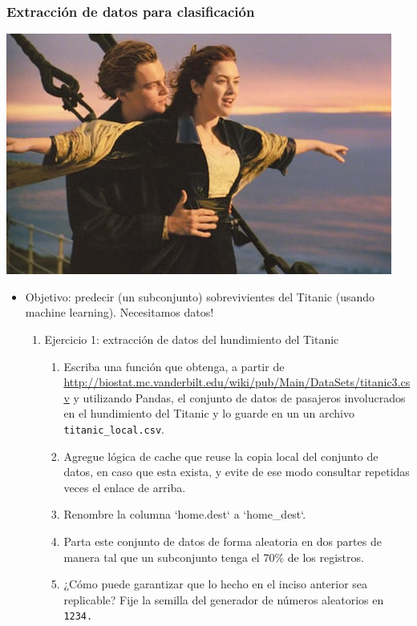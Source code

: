 \documentclass[leqno, 10pt, envcountsect]{beamer}
\numberwithin{equation}{section}
\theoremstyle{definition}
\theoremstyle{example}
\numberwithin{figure}{section}
\numberwithin{table}{section}
\let\olditem\item
\renewcommand{\item}{%
\olditem\vspace{1pt}}
\begin{document}
\begin{frame}
  \frametitle{Extracción de datos para clasificación}
  \begin{center}
    \includegraphics[scale=0.33]{titanic.jpg}
  \end{center}
  \begin{itemize}
    \item Objetivo: predecir (un subconjunto) sobrevivientes del Titanic (usando machine
      learning). Necesitamos datos!
      \begin{enumerate}
            \item Ejercicio 1: extracción de datos del hundimiento del Titanic
              \begin{enumerate}
                \item Escriba una función que obtenga, a partir de
                  \href{http://biostat.mc.vanderbilt.edu/wiki/pub/Main/DataSets/titanic3.csv}{http://biostat.mc.vanderbilt.edu/wiki/pub/Main/DataSets/titanic3.csv} y utilizando Pandas, el conjunto de datos de pasajeros
                  involucrados en el hundimiento del Titanic y lo guarde en un
                  un archivo \texttt{titanic_local.csv}.
                \item Agregue lógica de cache que reuse la copia local del
                  conjunto de datos, en caso que esta exista, y evite de ese
                  modo consultar repetidas veces el enlace de arriba.
                \item Renombre la columna `home.dest` a `home\_dest`.
                \item Parta este conjunto de datos de forma aleatoria en dos
                  partes de manera tal que un subconjunto tenga el 70\% de los
                  registros.
                \item ¿Cómo puede garantizar que lo hecho en el inciso anterior
                  sea replicable?  Fije la semilla del generador de números
                  aleatorios en \texttt{1234.}
              \end{enumerate}
        \end{enumerate}
  \end{itemize}
\end{frame}
\end{document}
